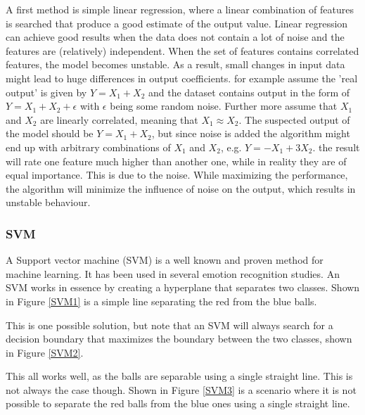A first method is simple linear regression, where a linear combination of features is searched that produce a good estimate of the output value. Linear regression can achieve good results when the data does not contain a lot of noise and the features are (relatively) independent. When the set of features contains correlated features, the model becomes unstable. As a result, small changes in input data might lead to huge differences in output coefficients. for example assume the 'real output' is given by $Y = X_1 + X_2$ and the dataset contains output in the form of $Y = X_1 + X_2 + \epsilon$ with $\epsilon$ being some random noise. Further more assume that $X_1$ and $X_2$ are linearly correlated, meaning that $X_1 \approx X_2$. The suspected output of the model should be $Y = X_1 + X_2$, but since noise is added the algorithm might end up with arbitrary combinations of $X_1$ and $X_2$, e.g. $Y = -X_1 + 3X_2$. the result will rate one feature much higher than another one, while in reality they are of equal importance. This is due to the noise. While maximizing the performance, the algorithm will minimize the influence of noise on the output, which results in unstable behaviour.

\subsubsection{SVM}

A Support vector machine (SVM) is a well known and proven method for machine learning. It has been used in several emotion recognition studies. An SVM works in essence by creating a hyperplane that separates two classes. Shown in Figure \ref{SVM1} is a simple line separating the red from the blue balls.


This is one possible solution, but note that an SVM will always search for a decision boundary that maximizes the boundary between the two classes, shown in Figure \ref{SVM2}.


This all works well, as the balls are separable using a single straight line. This is not always the case though. Shown in Figure \ref{SVM3} is a scenario where it is not possible to separate the red balls from the blue ones using a single straight line.


